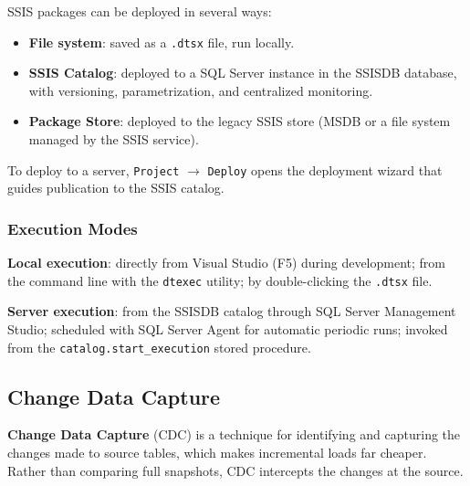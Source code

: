 SSIS packages can be deployed in several ways:

\begin{itemize}
    \item \textbf{File system}: saved as a \texttt{.dtsx} file, run locally.
    \item \textbf{SSIS Catalog}: deployed to a SQL Server instance in the SSISDB database, with versioning, parametrization, and centralized monitoring.
    \item \textbf{Package Store}: deployed to the legacy SSIS store (MSDB or a file system managed by the SSIS service).
\end{itemize}

To deploy to a server, \texttt{Project} $\rightarrow$ \texttt{Deploy} opens the deployment wizard that guides publication to the SSIS catalog.

\subsubsection{Execution Modes}
\label{subsec:ssis-execution}

\begin{notebox}
\textbf{Local execution}: directly from Visual Studio (F5) during development; from the command line with the \texttt{dtexec} utility; by double-clicking the \texttt{.dtsx} file.

\textbf{Server execution}: from the SSISDB catalog through SQL Server Management Studio; scheduled with SQL Server Agent for automatic periodic runs; invoked from the \texttt{catalog.start\_execution} stored procedure.
\end{notebox}

\subsection{Change Data Capture}
\label{sec:cdc}

\textbf{Change Data Capture} (CDC) is a technique for identifying and capturing the changes made to source tables, which makes incremental loads far cheaper. Rather than comparing full snapshots, CDC intercepts the changes at the source.

